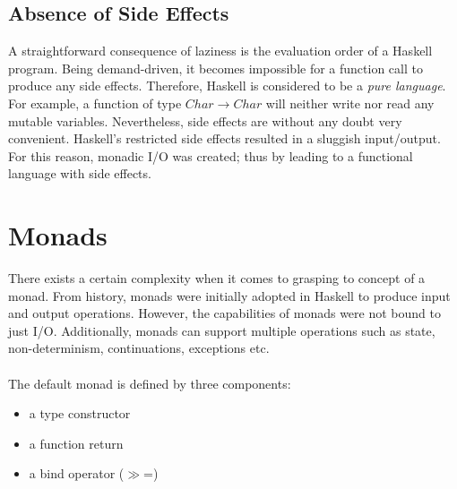 \documentclass[a4paper, twocolumn]{article}
\begin{document}
\subsection{Absence of Side Effects}

A straightforward consequence of laziness is the evaluation order of a Haskell program. Being demand-driven, it becomes impossible for a function call to produce any side effects. Therefore, Haskell is considered to be a \textit{pure language}. For example, a function of type $Char \rightarrow Char$ will neither write nor read any mutable variables. Nevertheless, side effects are without any doubt very convenient. Haskell's restricted side effects resulted in a sluggish input/output. For this reason, monadic I/O was created; thus by leading to a functional language with side effects. 
\section{Monads}

There exists a certain complexity when it comes to grasping to concept of a monad. From history, monads were initially adopted in Haskell to produce input and output operations. However, the capabilities of monads were not bound to just I/O. Additionally, monads can support multiple operations such as state, non-determinism, continuations, exceptions etc. \\ \\ 
The default monad is defined by three components: 
\begin{itemize}
    \item a type constructor
    \item a function return
    \item a bind operator ($\gg$=)
\end{itemize}
\end{document}
